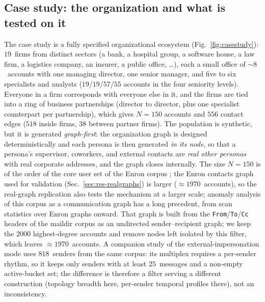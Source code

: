 \subsection{Case study: the organization and what is tested on it}
\label{sec:cs-setup}
The case study is a fully specified organizational ecosystem (Fig.~\ref{fig:casestudy}): $19$~firms from
distinct sectors (a bank, a hospital group, a software house, a law firm, a logistics company, an insurer,
a public office, \dots), each a small office of $\sim\!8$~accounts with one managing director, one senior
manager, and five to six specialists and analysts ($19$/$19$/$57$/$55$ accounts in the four seniority
levels). Everyone in a firm corresponds with everyone else in it, and the firms are tied into a ring of
business partnerships (director to director, plus one specialist counterpart per partnership), which gives
$N{=}150$ accounts and $556$ contact edges ($518$ inside firms, $38$ between partner firms). The population is
synthetic, but it is generated \emph{graph-first}: the organization graph is designed deterministically and
each persona is then generated \emph{in its node}, so that a persona's supervisor, coworkers, and external
contacts are \emph{real other personas} with real corporate addresses, and the graph closes internally. The
size $N{=}150$ is of the order of the core user set of the Enron corpus \citep{klimt2004enron}; the Enron
contacts graph used for validation (Sec.~\ref{sec:res-realgraphs}) is larger (${\approx}1970$~accounts), so the
real-graph replication also tests the mechanism at a larger scale; anomaly analysis of this corpus as a
communication graph has a long precedent, from scan statistics over Enron graphs \citep{priebe2005scan} onward. That graph is built from the
\texttt{From}/\texttt{To}/\texttt{Cc} headers of the maildir corpus as an undirected sender--recipient graph;
we keep the $2000$ highest-degree accounts and remove nodes left isolated by this filter, which leaves
${\approx}1970$~accounts. A companion study of the external-impersonation mode uses $818$~senders from the same corpus: its
multiplex requires a per-sender rhythm, so it keeps only senders with at least $25$~messages and a
non-empty active-bucket set; the difference is therefore a filter serving a different construction
(topology breadth here, per-sender temporal profiles there), not an inconsistency.

